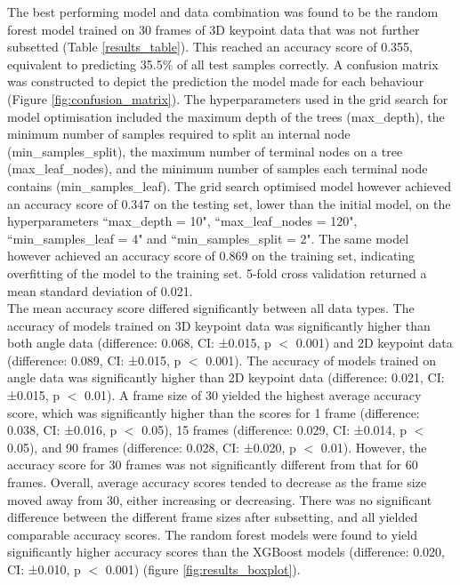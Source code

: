 \documentclass[11pt, letterpaper]{article} %
\begin{document}
    \noindent The best performing model and data combination was found to be the random forest model trained on 30 frames of 3D keypoint data that was not further subsetted (Table \ref{results_table}). This reached an accuracy score of 0.355, equivalent to predicting 35.5\% of all test samples correctly. A confusion matrix was constructed to depict the prediction the model made for each behaviour (Figure \ref{fig:confusion_matrix}). The hyperparameters used in the grid search for model optimisation included the maximum depth of the trees (max\_depth), the minimum number of samples required to split an internal node (min\_samples\_split), the maximum number of terminal nodes on a tree (max\_leaf\_nodes), and the minimum number of samples each terminal node contains (min\_samples\_leaf). The grid search optimised model however achieved an accuracy score of 0.347 on the testing set, lower than the initial model, on the hyperparameters ``max\_depth = 10", ``max\_leaf\_nodes = 120", ``min\_samples\_leaf = 4" and ``min\_samples\_split = 2". The same model however achieved an accuracy score of 0.869 on the training set, indicating overfitting of the model to the training set. 5-fold cross validation returned a mean standard deviation of 0.021. \\
    
    \noindent The mean accuracy score differed significantly between all data types. The accuracy of models trained on 3D keypoint data was significantly higher than both angle data (difference: 0.068, CI: ±0.015, p $<$ 0.001) and 2D keypoint data (difference: 0.089, CI: ±0.015, p $<$ 0.001). The accuracy of models trained on angle data was significantly higher than 2D keypoint data (difference: 0.021, CI: ±0.015, p $<$ 0.01).
    A frame size of 30 yielded the highest average accuracy score, which was significantly higher than the scores for 1 frame (difference: 0.038, CI: ±0.016, p $<$ 0.05), 15 frames (difference: 0.029, CI: ±0.014, p $<$ 0.05), and 90 frames (difference: 0.028, CI: ±0.020, p $<$ 0.01). However, the accuracy score for 30 frames was not significantly different from that for 60 frames. Overall, average accuracy scores tended to decrease as the frame size moved away from 30, either increasing or decreasing.
    There was no significant difference between the different frame sizes after subsetting, and all yielded comparable accuracy scores.
    The random forest models were found to yield significantly higher accuracy scores than the XGBoost models (difference: 0.020, CI: ±0.010, p $<$ 0.001) (figure \ref{fig:results_boxplot}).\\
\end{document}

